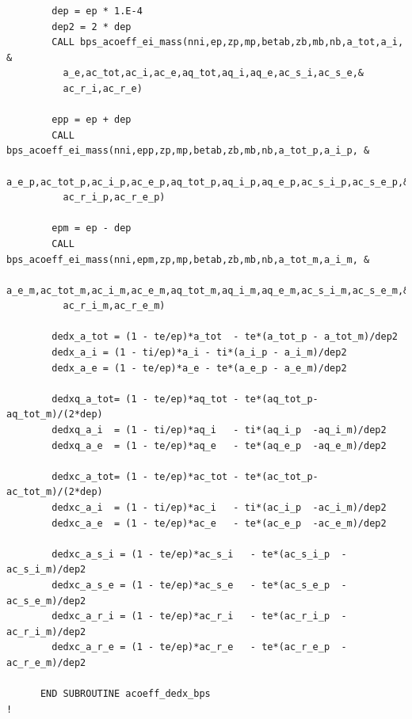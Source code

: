 \documentclass[preprint,12pt,eqsecnum,nofootinbib,amsmath,amssymb]{revtex4}
\begin{document}
{\begin{verbatim}
        dep = ep * 1.E-4
        dep2 = 2 * dep
        CALL bps_acoeff_ei_mass(nni,ep,zp,mp,betab,zb,mb,nb,a_tot,a_i, &
          a_e,ac_tot,ac_i,ac_e,aq_tot,aq_i,aq_e,ac_s_i,ac_s_e,&
          ac_r_i,ac_r_e)

        epp = ep + dep
        CALL bps_acoeff_ei_mass(nni,epp,zp,mp,betab,zb,mb,nb,a_tot_p,a_i_p, &
          a_e_p,ac_tot_p,ac_i_p,ac_e_p,aq_tot_p,aq_i_p,aq_e_p,ac_s_i_p,ac_s_e_p,&
          ac_r_i_p,ac_r_e_p)

        epm = ep - dep
        CALL bps_acoeff_ei_mass(nni,epm,zp,mp,betab,zb,mb,nb,a_tot_m,a_i_m, &
          a_e_m,ac_tot_m,ac_i_m,ac_e_m,aq_tot_m,aq_i_m,aq_e_m,ac_s_i_m,ac_s_e_m,&
          ac_r_i_m,ac_r_e_m)

        dedx_a_tot = (1 - te/ep)*a_tot  - te*(a_tot_p - a_tot_m)/dep2
        dedx_a_i = (1 - ti/ep)*a_i - ti*(a_i_p - a_i_m)/dep2        
        dedx_a_e = (1 - te/ep)*a_e - te*(a_e_p - a_e_m)/dep2

        dedxq_a_tot= (1 - te/ep)*aq_tot - te*(aq_tot_p-aq_tot_m)/(2*dep)
        dedxq_a_i  = (1 - ti/ep)*aq_i   - ti*(aq_i_p  -aq_i_m)/dep2
        dedxq_a_e  = (1 - te/ep)*aq_e   - te*(aq_e_p  -aq_e_m)/dep2

        dedxc_a_tot= (1 - te/ep)*ac_tot - te*(ac_tot_p-ac_tot_m)/(2*dep)        
        dedxc_a_i  = (1 - ti/ep)*ac_i   - ti*(ac_i_p  -ac_i_m)/dep2
        dedxc_a_e  = (1 - te/ep)*ac_e   - te*(ac_e_p  -ac_e_m)/dep2
        
        dedxc_a_s_i = (1 - te/ep)*ac_s_i   - te*(ac_s_i_p  -ac_s_i_m)/dep2
        dedxc_a_s_e = (1 - te/ep)*ac_s_e   - te*(ac_s_e_p  -ac_s_e_m)/dep2
        dedxc_a_r_i = (1 - te/ep)*ac_r_i   - te*(ac_r_i_p  -ac_r_i_m)/dep2
        dedxc_a_r_e = (1 - te/ep)*ac_r_e   - te*(ac_r_e_p  -ac_r_e_m)/dep2

      END SUBROUTINE acoeff_dedx_bps
!


\end{verbatim}}
\end{document}
